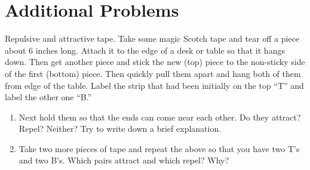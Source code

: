 \chapter*{Additional Problems}
\label{chap:additional_problems}


\begin{aproblem}{Repulsive and attractive tape.}  
  Take some magic Scotch tape and tear off a piece about 6 inches
  long.  Attach it to the edge of a desk or table so that it hangs
  down.  Then get another piece and stick the new (top) piece to the
  non-sticky side of the first (bottom) piece. Then quickly pull them
  apart and hang both of them from edge of the table.  Label the strip
  that had been initially on the top ``T'' and label the other one
  ``B.''
  \begin{enumerate} 
  \item Next hold them so that the ends can come near each other.  Do
    they attract?  Repel?  Neither?  Try to write down a brief
    explanation.
  \item Take two more pieces of tape and repeat the above so that you
    have two T's and two B's.  Which pairs attract and which repel?
    Why?
  \end{enumerate}
\end{aproblem}

